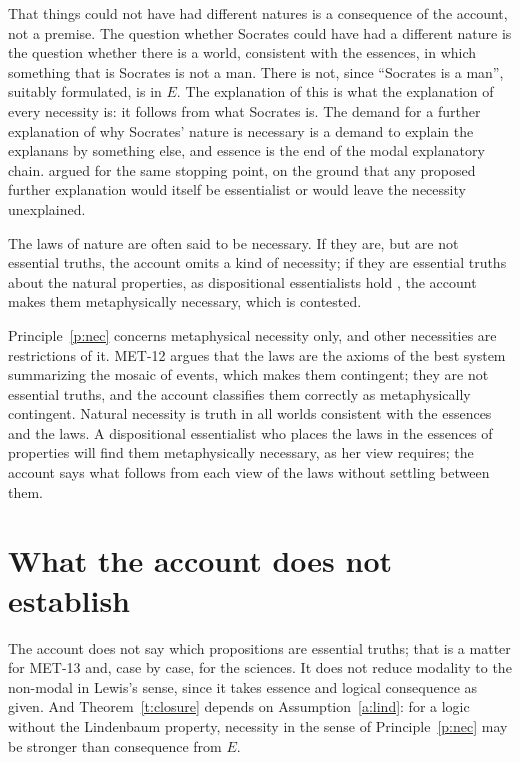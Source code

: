 \documentclass{situationist-preprint}
\begin{document}
\begin{reply}
That things could not have had different natures is a consequence of the account, not a premise. The question whether Socrates could have had a different nature is the question whether there is a world, consistent with the essences, in which something that is Socrates is not a man. There is not, since \enquote{Socrates is a man}, suitably formulated, is in $E$. The explanation of this is what the explanation of every necessity is: it follows from what Socrates is. The demand for a further explanation of why Socrates' nature is necessary is a demand to explain the explanans by something else, and essence is the end of the modal explanatory chain. \citet[ch.~3]{Hale2013} argued for the same stopping point, on the ground that any proposed further explanation would itself be essentialist or would leave the necessity unexplained.
\end{reply}

\begin{objection}
The laws of nature are often said to be necessary. If they are, but are not essential truths, the account omits a kind of necessity; if they are essential truths about the natural properties, as dispositional essentialists hold \citep{Bird2007}, the account makes them metaphysically necessary, which is contested.
\end{objection}

\begin{reply}
Principle~\ref{p:nec} concerns metaphysical necessity only, and other necessities are restrictions of it. MET-12 argues that the laws are the axioms of the best system summarizing the mosaic of events, which makes them contingent; they are not essential truths, and the account classifies them correctly as metaphysically contingent. Natural necessity is truth in all worlds consistent with the essences and the laws. A dispositional essentialist who places the laws in the essences of properties will find them metaphysically necessary, as her view requires; the account says what follows from each view of the laws without settling between them.
\end{reply}

\section{What the account does not establish}

The account does not say which propositions are essential truths; that is a matter for MET-13 and, case by case, for the sciences. It does not reduce modality to the non-modal in Lewis's sense, since it takes essence and logical consequence as given. And Theorem~\ref{t:closure} depends on Assumption~\ref{a:lind}: for a logic without the Lindenbaum property, necessity in the sense of Principle~\ref{p:nec} may be stronger than consequence from $E$.
\end{document}
